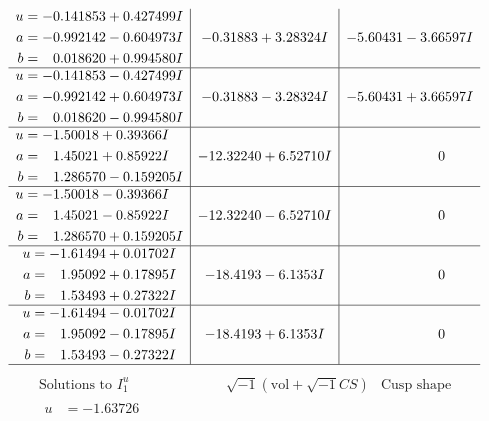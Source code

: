 \documentclass[1p]{elsarticle_modified}
\theoremstyle{definition}
\newcommand{\I}{\sqrt{-1}}
\begin{document}
$$\begin{array}{c|c|c}
\begin{aligned}
u &= -0.141853 + 0.427499 I \\
a &= -0.992142 - 0.604973 I \\
b &= \phantom{-}0.018620 + 0.994580 I\end{aligned}
 & -0.31883 + 3.28324 I & -5.60431 - 3.66597 I \\ \hline\begin{aligned}
u &= -0.141853 - 0.427499 I \\
a &= -0.992142 + 0.604973 I \\
b &= \phantom{-}0.018620 - 0.994580 I\end{aligned}
 & -0.31883 - 3.28324 I & -5.60431 + 3.66597 I \\ \hline\begin{aligned}
u &= -1.50018 + 0.39366 I \\
a &= \phantom{-}1.45021 + 0.85922 I \\
b &= \phantom{-}1.286570 - 0.159205 I\end{aligned}
 & -12.32240 + 6.52710 I & \phantom{-0.000000 } 0 \\ \hline\begin{aligned}
u &= -1.50018 - 0.39366 I \\
a &= \phantom{-}1.45021 - 0.85922 I \\
b &= \phantom{-}1.286570 + 0.159205 I\end{aligned}
 & -12.32240 - 6.52710 I & \phantom{-0.000000 } 0 \\ \hline\begin{aligned}
u &= -1.61494 + 0.01702 I \\
a &= \phantom{-}1.95092 + 0.17895 I \\
b &= \phantom{-}1.53493 + 0.27322 I\end{aligned}
 & -18.4193 - 6.1353 I & \phantom{-0.000000 } 0 \\ \hline\begin{aligned}
u &= -1.61494 - 0.01702 I \\
a &= \phantom{-}1.95092 - 0.17895 I \\
b &= \phantom{-}1.53493 - 0.27322 I\end{aligned}
 & -18.4193 + 6.1353 I & \phantom{-0.000000 } 0\\
 \hline 
 \end{array}$$\newpage$$\begin{array}{c|c|c}  
\text{Solutions to }I^u_{1}& \I (\text{vol} + \sqrt{-1}CS) & \text{Cusp shape}\\
 \hline 
\begin{aligned}
u &= -1.63726\phantom{ +0.000000I} \\

\end{aligned}
\end{array}$$
\end{document}
